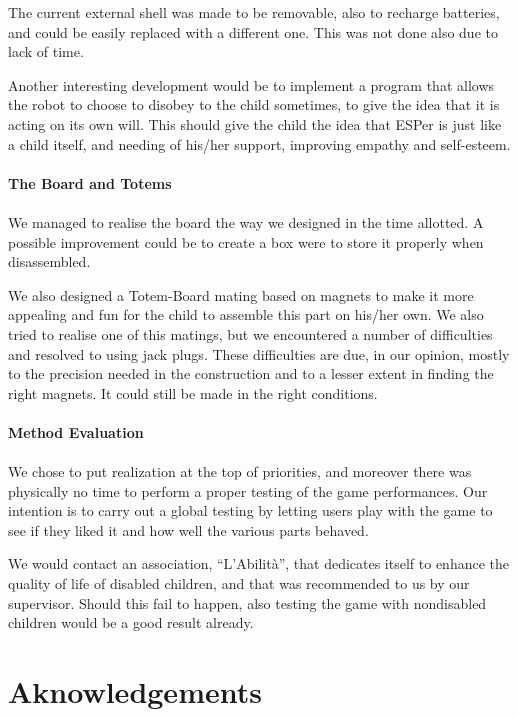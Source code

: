 \documentclass[a4paper,twoside]{book}
\begin{document}
The current external shell was made to be removable, also to recharge batteries, and could be easily replaced with a different one. This was not done also due to lack of time. 

Another interesting development would be to implement a program that allows the robot to choose to disobey to the child sometimes, to give the idea that it is acting on its own will. This should give the child the idea that ESPer is just like a child itself, and needing of his/her support, improving empathy and self-esteem.
\\
\\
\textbf{The Board and Totems}
\\
\\
We managed to realise the board the way we designed in the time allotted. A possible improvement could be to create a box were to store it properly when disassembled. 

We also designed a Totem-Board mating based on magnets to make it more appealing and fun for the child to assemble this part on his/her own. We also tried to realise one of this matings, but we encountered a number of difficulties and resolved to using jack plugs. These difficulties are due, in our opinion, mostly to the precision needed in the construction and  to a lesser extent in finding the right magnets. It could still be made in the right conditions.
\\
\\
\textbf{Method Evaluation}
\\
\\
We chose to put realization at the top of priorities, and moreover there was physically no time to perform a proper testing of the game performances. Our intention is to carry out a global testing by letting users play with the game to see if they liked it and how well the various parts behaved.

We would contact an association, \textquotedblleft L'Abilit\`{a}\textquotedblright , that dedicates itself to enhance the quality of life of disabled children, and that was recommended to us by our supervisor. Should this fail to happen, also testing the game with non\textendash disabled children would be a good result already.

\chapter{Aknowledgements}
\end{document}
